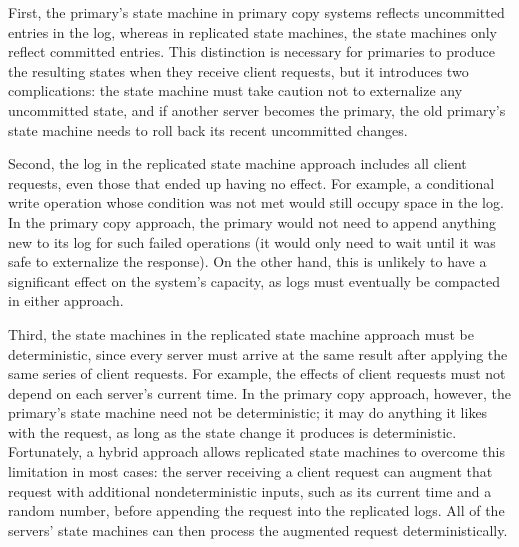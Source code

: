 First, the primary's state machine in primary copy systems reflects
uncommitted entries in the log, whereas in replicated state machines,
the state machines only reflect committed entries. This distinction is
necessary for primaries to produce the resulting states when they
receive client requests, but it introduces two complications: the state
machine must take caution not to externalize any uncommitted state, and
if another server becomes the primary, the old primary's state machine
needs to roll back its recent uncommitted changes.

Second, the log in the replicated state machine approach includes all
client requests, even those that ended up having no effect. For example,
a conditional write operation whose condition was not met would still
occupy space in the log. In the primary copy approach, the primary would
not need to append anything new to its log for such failed operations
(it would only need to wait until it was safe to externalize the
response). On the other hand, this is unlikely to have a significant
effect on the system's capacity, as logs must eventually be compacted in
either approach.

Third, the state machines in the replicated state machine approach must
be deterministic, since every server must arrive at the same result
after applying the same series of client requests. For example, the
effects of client requests must not depend on each server's current
time. In the primary copy approach, however, the primary's state machine
need not be deterministic; it may do anything it likes with the request,
as long as the state change it produces is deterministic. Fortunately, a
hybrid approach allows replicated state machines to overcome this
limitation in most cases: the server receiving a client request can
augment that request with additional nondeterministic inputs, such as
its current time and a random number, before appending the request into
the replicated logs. All of the servers' state machines can then process
the augmented request deterministically.


